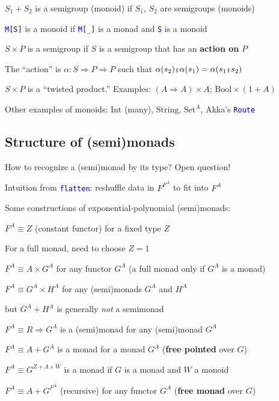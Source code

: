 $S_{1}+S_{2}$ is a semigroup (monoid) if $S_{1}$, $S_{2}$ are semigroups
(monoids)

\texttt{\textcolor{blue}{\footnotesize{}M{[}S{]}}} is a monoid if
\texttt{\textcolor{blue}{\footnotesize{}M{[}\_{]}}} is a monad and
\texttt{\textcolor{blue}{\footnotesize{}S}} is a monoid

$S\times P$ is a semigroup if $S$ is a semigroup that has an \textbf{action
on} $P$

The ``action'' is $\alpha:S\Rightarrow P\Rightarrow P$ such that
$\alpha(s_{2})\bef\alpha(s_{1})=\alpha(s_{1}\bef s_{2})$

$S\times P$ is a ``twisted product.'' Examples: $\left(A\Rightarrow A\right)\times A$;
$\text{Bool}\times\left(1+A\right)$

Other examples of monoids: $\text{Int}$ (many), $\text{String}$,
$\text{Set}^{A}$, Akka's \texttt{\textcolor{blue}{\footnotesize{}Route}} 


\subsection{Structure of (semi)monads}

How to recognize a (semi)monad by its type? Open question!

Intuition from \texttt{\textcolor{blue}{\footnotesize{}flatten}}:
reshuffle data in $F^{F^{A}}$ to fit into $F^{A}$

Some constructions of exponential-polynomial (semi)monads:

$F^{A}\equiv Z$ (constant functor) for a fixed type $Z$

For a full monad, need to choose $Z=1$ 

$F^{A}\equiv A\times G^{A}$ for any functor $G^{A}$ (a full monad
only if $G^{A}$ is a monad)

$F^{A}\equiv G^{A}\times H^{A}$ for any (semi)monads $G^{A}$ and
$H^{A}$

but $G^{A}+H^{A}$ is generally \emph{not} a semimonad

$F^{A}\equiv R\Rightarrow G^{A}$ is a (semi)monad for any (semi)monad
$G^{A}$

$F^{A}\equiv A+G^{A}$ is a monad for a monad $G^{A}$ (\textbf{free
pointed} over $G$)

$F^{A}\equiv G^{Z+A\times W}$ is a monad if $G$ is a monad and $W$
a monoid

$F^{A}\equiv A+G^{F^{A}}$ (recursive) for any functor $G^{A}$ (\textbf{free
monad} over $G$)

